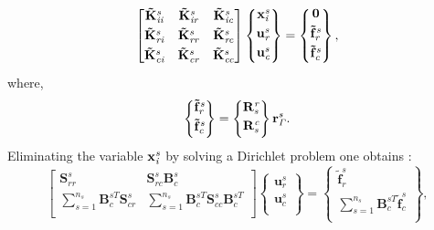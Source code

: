 \documentclass{article}
\begin{document}
\begin{equation}\label{eq:N-NNC2}
{\begin{bmatrix}
   \bf{\tilde{K}}^{\it{s}}_{\it{ii}} & \bf{\tilde{K}}^{\it{s}}_{\it{ir}} & \bf{\tilde{K}}^{\it{s}}_{\it{ic}}
\\[0.3em]
     \bf{\tilde{K}}^{\it{s}}_{\it{ri}}   & \bf{\tilde{K}}^{\it{s}}_{\it{rr}} & \bf{\tilde{K}}^{\it{s}}_{\it{rc}}
\\[0.3em]
     \bf{\tilde{K}}^{\it{s}}_{\it{ci}}  & \bf{\tilde{K}}^{\it{s}}_{\it{cr}} & \bf{\tilde{K}}^{\it{s}}_{\it{cc}}
\end{bmatrix}}
\begin{Bmatrix}
     \bf{x}^{\it{s}}_{\it{i}}
\\[0.3em]
     \bf{u}^{\it{s}}_{\it{r}}
\\[0.3em]
      \bf{u}^{\it{s}}_{\it{c}}
\\[0.3em]
\end{Bmatrix}  =
\begin{Bmatrix}
     \bf{0}
\\[0.3em]
    \bf{\tilde{f}}^{\it{s}}_{\it{r}}
\\[0.3em]
    \bf{\tilde{f}}^{\it{s}}_{\it{c}}
\\[0.3em]
\end{Bmatrix},
\end{equation}
where,
\begin{equation}
\begin{Bmatrix}
      \bf{\tilde{f}}^{\it{s}}_{\it{r}}
\\[0.3em]
      \bf{\tilde{f}}^{\it{s}}_{\it{c}}
\\[0.3em]
\end{Bmatrix}  =
\begin{Bmatrix}
     \bf{R}_{\it{s}}^{\it{r}}
\\[0.3em]
     \bf{R}_{\it{s}}^{\it{c}}
\\[0.3em]
\end{Bmatrix}
\bf{r^{\it{s}}_{\it\Gamma}}.
\end{equation}
Eliminating the variable $\bf{x}^{\it{s}}_{\it{i}}$ by solving a Dirichlet problem one obtains \cite{subber_thesis}:
\begin{equation}\label{eq:N-NNC3}
{
\begin{bmatrix}
   {\mathbf{S}_{rr} ^s}  & {\mathbf{S}_{rc} ^s \mathbf{B}_c ^s }
\\[0.3em]
     {\displaystyle \sum_{s=1}^{n_s} \mathbf{B}^{sT}_c \mathbf{S}_{cr} ^s } &  { \displaystyle \sum_{s=1}^{n_s} \mathbf{B}^{sT}_c \mathbf{S}_{cc} ^s \mathbf{B}^{sT}_c}
\\[0.3em]
\end{bmatrix}
}
{
\begin{Bmatrix}
     {{\mathbf{u}^s_r}}
\\[0.3em]
      {{\mathbf{u}^s_c}}
\\[0.3em]
\end{Bmatrix} 
}  =
\begin{Bmatrix}
    \tilde{\mathbf{f}}^s_r
\\[0.3em]
    \displaystyle \sum_{s=1}^{n_s} \mathbf{B}^{sT}_c \tilde{\mathbf{f}}^s_c
\\[0.3em]
\end{Bmatrix},
\end{equation}
\end{document}
